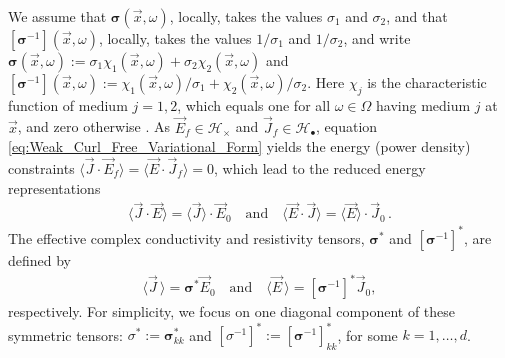 \documentclass[english,12pt,jmp,graphicx]{revtex4-1}
\begin{document}
We assume that $\bm{\sigma}(\vec{x},\omega)$, locally, takes the values $\sigma_1$
and $\sigma_2$, and that $[\bm{\sigma}^{-1}](\vec{x},\omega)$, locally, takes the
values $1/\sigma_1$ and $1/\sigma_2$, and write 
$\bm{\sigma}(\vec{x},\omega):=\sigma_1\chi_1(\vec{x},\omega)+\sigma_2\chi_2(\vec{x},\omega)$ and
$[\bm{\sigma}^{-1}](\vec{x},\omega):=\chi_1(\vec{x},\omega)/\sigma_1+\chi_2(\vec{x},\omega)/\sigma_2$.
Here $\chi_j$ is the characteristic function of medium $j=1,2$, which
equals one for all $\omega\in\Omega$ having medium $j$ at $\vec{x}$, and zero
otherwise \cite{Golden:CMP-473}. As $\vec{E}_f\in\mathscr{H}_\times$ and
$\vec{J}_f\in\mathscr{H}_{\bullet}$, equation
\eqref{eq:Weak_Curl_Free_Variational_Form}
yields the energy (power density) constraints
$\langle\vec{J}\cdot\vec{E}_f\rangle=\langle\vec{E}\cdot\vec{J}_f\rangle=0$, which lead to the
reduced energy representations   
%
\begin{align}\label{eq:Reduced_System_Energy_Representations}
  \langle\vec{J}\cdot\vec{E}\rangle=\langle\vec{J}\rangle\cdot\vec{E}_0 \quad \text{and} \quad
  \langle\vec{E}\cdot\vec{J}\rangle=\langle\vec{E}\rangle\cdot\vec{J}_0\,.
\end{align}
%
The effective complex conductivity and resistivity tensors, $\bm{\sigma}^*$
and $[\bm{\sigma}^{-1}]^*$, are defined by  
%
\begin{align}\label{eq:eff_eps_def}
    \langle \vec{J} \,\rangle=  \bm{\sigma}^* \vec{E}_0 \quad \text{and} \quad
    \langle \vec{E} \,\rangle=  [\bm{\sigma}^{-1}]^*\vec{J}_0,
\end{align}
%
respectively. For simplicity, we focus on one diagonal component of
these symmetric tensors: $\sigma^*:=\bm{\sigma}^*_{kk}$ and
$[\sigma^{-1}]^*:=[\bm{\sigma}^{-1}]^*_{kk}$, for some $k=1,\ldots,d$.
\end{document}
